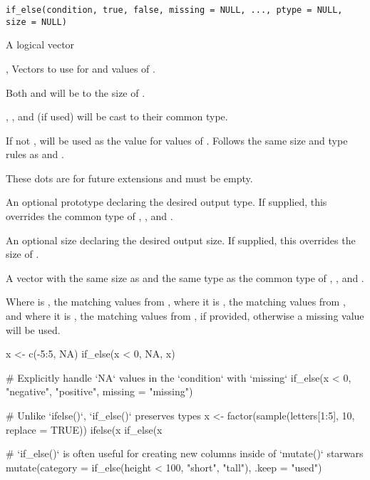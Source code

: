\documentclass[a4paper]{book}
\begin{document}
%
\begin{Usage}
\begin{verbatim}
if_else(condition, true, false, missing = NULL, ..., ptype = NULL, size = NULL)
\end{verbatim}
\end{Usage}
%
\begin{Arguments}
\begin{ldescription}
\item[\code{condition}] A logical vector

\item[\code{true}, \code{false}] Vectors to use for  and  values of
.

Both  and  will be 
to the size of .

, , and  (if used) will be cast to their common type.

\item[\code{missing}] If not , will be used as the value for  values of
. Follows the same size and type rules as  and .

\item[\code{...}] These dots are for future extensions and must be empty.

\item[\code{ptype}] An optional prototype declaring the desired output type. If
supplied, this overrides the common type of , , and .

\item[\code{size}] An optional size declaring the desired output size. If supplied,
this overrides the size of .
\end{ldescription}
\end{Arguments}
%
\begin{Value}
A vector with the same size as  and the same type as the common
type of , , and .

Where  is , the matching values from , where it is
, the matching values from , and where it is , the matching
values from , if provided, otherwise a missing value will be used.
\end{Value}
%
\begin{Examples}
\begin{ExampleCode}
x <- c(-5:5, NA)
if_else(x < 0, NA, x)

# Explicitly handle `NA` values in the `condition` with `missing`
if_else(x < 0, "negative", "positive", missing = "missing")

# Unlike `ifelse()`, `if_else()` preserves types
x <- factor(sample(letters[1:5], 10, replace = TRUE))
ifelse(x %
if_else(x %

# `if_else()` is often useful for creating new columns inside of `mutate()`
starwars %
  mutate(category = if_else(height < 100, "short", "tall"), .keep = "used")
\end{ExampleCode}
\end{Examples}
\end{document}
